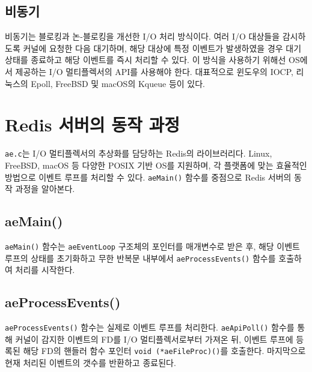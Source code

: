 \documentclass[11pt]{article}
\begin{document}
\subsection{비동기}
비동기는 블로킹과 논-블로킹을 개선한 I/O 처리 방식이다. 여러 I/O 대상들을 감시하도록
커널에 요청한 다음 대기하며, 해당 대상에 특정 이벤트가 발생하였을 경우 대기 상태를
종료하고 해당 이벤트를 즉시 처리할 수 있다. 이 방식을 사용하기 위해선 OS에서 제공하는
I/O 멀티플렉서의 API를 사용해야 한다. 대표적으로 윈도우의 IOCP, 리눅스의 Epoll,
FreeBSD 및 macOS의 Kqueue 등이 있다.

\section{Redis 서버의 동작 과정}
\texttt{ae.c}는 I/O 멀티플렉서의 추상화를 담당하는 Redis의 라이브러리다. Linux,
FreeBSD, macOS 등 다양한 POSIX 기반 OS를 지원하며, 각 플랫폼에 맞는 효율적인
방법으로 이벤트 루프를 처리할 수 있다. \texttt{aeMain()} 함수를 중점으로 Redis
서버의 동작 과정을 알아본다.

\vspace{.2in}
\vspace{.2in}

\subsection{aeMain()}
\texttt{aeMain()} 함수는 \texttt{aeEventLoop} 구조체의 포인터를 매개변수로 받은
후, 해당 이벤트 루프의 상태를 초기화하고 무한 반복문 내부에서
\texttt{aeProcessEvents()} 함수를 호출하여 처리를 시작한다.

\subsection{aeProcessEvents()}
\texttt{aeProcessEvents()} 함수는 실제로 이벤트 루프를 처리한다.
\texttt{aeApiPoll()} 함수를 통해 커널이 감지한 이벤트의 FD를 I/O 멀티플렉서로부터
가져온 뒤, 이벤트 루프에 등록된 해당 FD의 핸들러 함수 포인터
\texttt{void (*aeFileProc)()}를 호출한다. 마지막으로 현재 처리된 이벤트의 갯수를
반환하고 종료된다.
\end{document}
